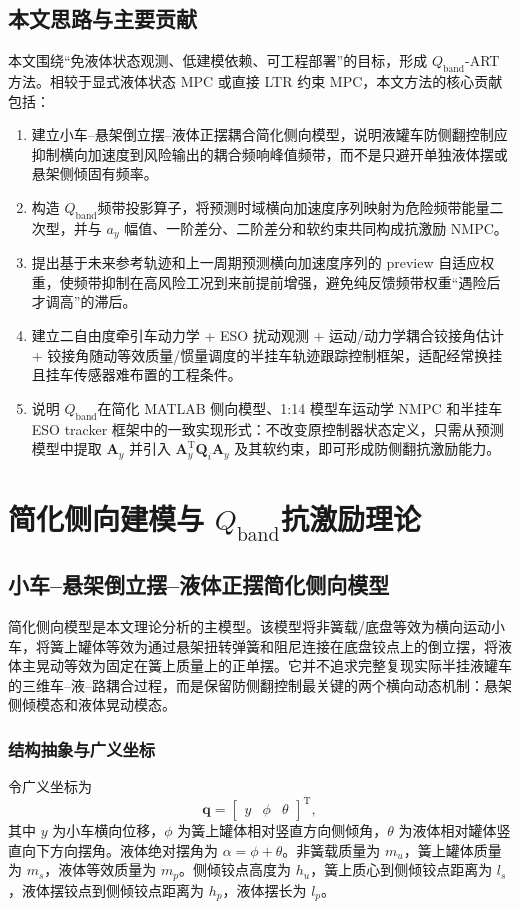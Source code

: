 \documentclass[UTF8,zihao=-4]{ctexrep}
\newcommand{\Qband}{$Q_{\mathrm{band}}$}
\newcommand{\ay}{a_y}
\newcommand{\T}{\mathrm{T}}
\begin{document}
\section{本文思路与主要贡献}
本文围绕“免液体状态观测、低建模依赖、可工程部署”的目标，形成 \Qband-ART 方法。相较于显式液体状态 MPC 或直接 LTR 约束 MPC，本文方法的核心贡献包括：
\begin{enumerate}[label=\textbf{C\arabic*.}]
  \item 建立小车--悬架倒立摆--液体正摆耦合简化侧向模型，说明液罐车防侧翻控制应抑制横向加速度到风险输出的耦合频响峰值频带，而不是只避开单独液体摆或悬架侧倾固有频率。
  \item 构造 \Qband 频带投影算子，将预测时域横向加速度序列映射为危险频带能量二次型，并与 $\ay$ 幅值、一阶差分、二阶差分和软约束共同构成抗激励 NMPC。
  \item 提出基于未来参考轨迹和上一周期预测横向加速度序列的 preview 自适应权重，使频带抑制在高风险工况到来前提前增强，避免纯反馈频带权重“遇险后才调高”的滞后。
  \item 建立二自由度牵引车动力学 + ESO 扰动观测 + 运动/动力学耦合铰接角估计 + 铰接角随动等效质量/惯量调度的半挂车轨迹跟踪控制框架，适配经常换挂且挂车传感器难布置的工程条件。
  \item 说明 \Qband 在简化 MATLAB 侧向模型、1:14 模型车运动学 NMPC 和半挂车 ESO tracker 框架中的一致实现形式：不改变原控制器状态定义，只需从预测模型中提取 $\bm A_y$ 并引入 $\bm A_y^{\T}\bm Q_i\bm A_y$ 及其软约束，即可形成防侧翻抗激励能力。
\end{enumerate}

\chapter{简化侧向建模与 \Qband 抗激励理论}

\section{小车--悬架倒立摆--液体正摆简化侧向模型}
简化侧向模型是本文理论分析的主模型。该模型将非簧载/底盘等效为横向运动小车，将簧上罐体等效为通过悬架扭转弹簧和阻尼连接在底盘铰点上的倒立摆，将液体主晃动等效为固定在簧上质量上的正单摆。它并不追求完整复现实际半挂液罐车的三维车--液--路耦合过程，而是保留防侧翻控制最关键的两个横向动态机制：悬架侧倾模态和液体晃动模态。

\subsection{结构抽象与广义坐标}
令广义坐标为
\begin{equation}
    \bm q = \begin{bmatrix} y & \phi & \theta \end{bmatrix}^{\T},
\end{equation}
其中 $y$ 为小车横向位移，$\phi$ 为簧上罐体相对竖直方向侧倾角，$\theta$ 为液体相对罐体竖直向下方向摆角。液体绝对摆角为 $\alpha=\phi+\theta$。非簧载质量为 $m_u$，簧上罐体质量为 $m_s$，液体等效质量为 $m_p$。侧倾铰点高度为 $h_u$，簧上质心到侧倾铰点距离为 $l_s$，液体摆铰点到侧倾铰点距离为 $h_p$，液体摆长为 $l_p$。
\end{document}
